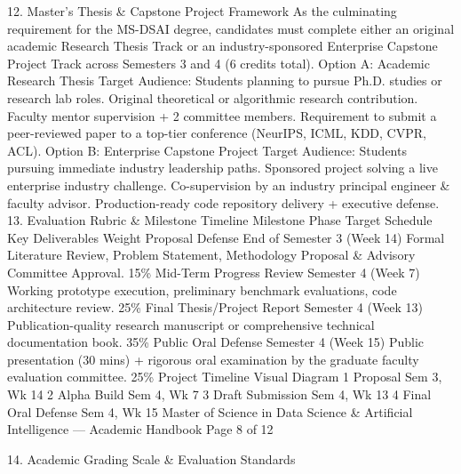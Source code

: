 \documentclass[12pt]{article}
\begin{document}
12. Master's Thesis \& Capstone Project Framework
As the culminating requirement for the MS-DSAI degree, candidates must complete either an original academic
Research Thesis Track or an industry-sponsored Enterprise Capstone Project Track across Semesters 3 and 4 (6
credits total).
Option A: Academic Research Thesis
Target Audience: Students planning to pursue Ph.D.
studies or research lab roles.
Original theoretical or algorithmic research contribution.
Faculty mentor supervision + 2 committee members.
Requirement to submit a peer-reviewed paper to a top-tier
conference (NeurIPS, ICML, KDD, CVPR, ACL).
Option B: Enterprise Capstone Project
Target Audience: Students pursuing immediate industry
leadership paths.
Sponsored project solving a live enterprise industry
challenge.
Co-supervision by an industry principal engineer \& faculty
advisor.
Production-ready code repository delivery + executive
defense.
13. Evaluation Rubric \& Milestone Timeline
Milestone Phase
Target Schedule
Key Deliverables
Weight
Proposal Defense
End of Semester 3
(Week 14)
Formal Literature Review, Problem Statement, Methodology
Proposal \& Advisory Committee Approval.
15\%
Mid-Term Progress
Review
Semester 4 (Week 7)
Working prototype execution, preliminary benchmark evaluations,
code architecture review.
25\%
Final Thesis/Project
Report
Semester 4 (Week
13)
Publication-quality research manuscript or comprehensive
technical documentation book.
35\%
Public Oral Defense
Semester 4 (Week
15)
Public presentation (30 mins) + rigorous oral examination by the
graduate faculty evaluation committee.
25\%
Project Timeline Visual Diagram
1
Proposal
Sem 3, Wk 14
2
Alpha Build
Sem 4, Wk 7
3
Draft Submission
Sem 4, Wk 13
4
Final Oral Defense
Sem 4, Wk 15
Master of Science in Data Science \& Artificial Intelligence — Academic Handbook
Page 8 of 12

14. Academic Grading Scale \& Evaluation Standards
\end{document}
